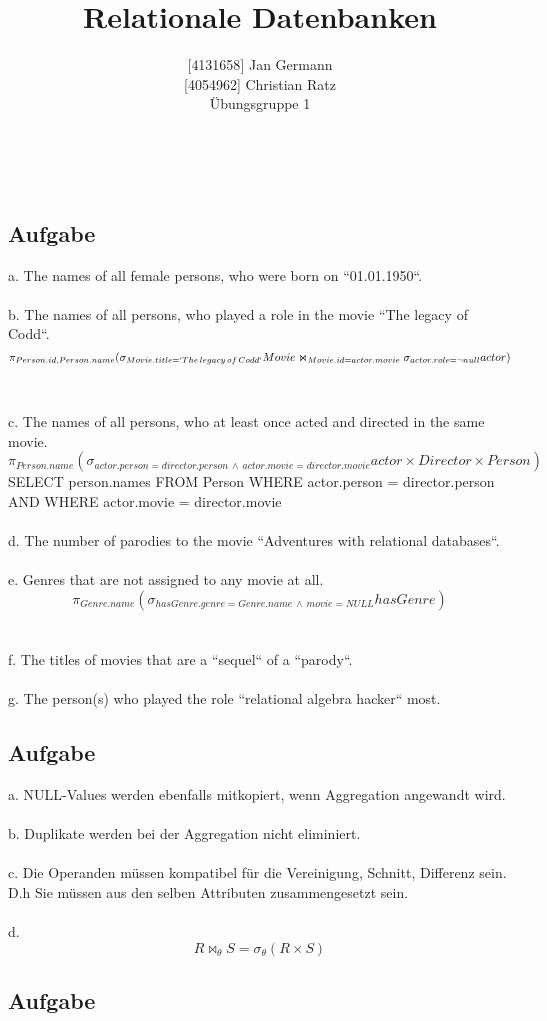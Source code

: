 \documentclass[11pt,a4paper,DIV=9]{scrartcl}
\author{{[}4131658{]} Jan Germann \\{[}4054962{]} Christian Ratz\\Übungsgruppe 1}
\title{Relationale Datenbanken}
\newcounter{temp}
\newcommand{\aufgabe}[1]{
  \setcounter{temp}{\value{subsection}}
  \setcounter{subsection}{#1}
  \addtocounter{subsection}{-1}
  \subsection{Aufgabe}
  \setcounter{subsection}{\value{temp}}
}
\renewcommand{\author}[1]{\renewcommand{\author}{#1}}
\renewcommand{\title}[1]{\renewcommand{\title}{#1}}
\newcommand{\makehomeworktitle}{
  \begin{minipage}[t]{6.5cm}
    \sf{\author}
  \end{minipage}
  \begin{minipage}[t]{6.5cm}
    \begin{flushright}
      \sf{\title\\\today}
    \end{flushright}
  \end{minipage}
  \\[0.2cm]
  \begin{center}
    \sf{
      \color{blue}{
        \LARGE{Aufgabenblatt \blattnr}
      }
    }
  \end{center}
  \vspace{0.1cm}
}
\begin{document}
\makehomeworktitle
\aufgabe{1}
 a. The names of all female persons, who were born on ``01.01.1950``.
 \\\\ b. The names of all persons, who played a role in the movie ``The legacy of Codd``.
 \begin{displaymath} \pi _{Person.id, Person.name} ( \sigma _{Movie.title=`{The\, legacy\, of\, Codd`}} Movie\Join_{Movie.id = actor.movie} \sigma _{actor.role = \neg null} actor)  \end{displaymath}
 \\\\ c. The names of all persons, who at least once acted and directed in the same movie.
 \begin{displaymath} \pi _{Person.name} (\sigma _{actor.person = director.person \,\wedge\, actor.movie = director.movie} actor \times Director \times Person) \end{displaymath}
 SELECT person.names FROM Person WHERE actor.person = director.person AND WHERE actor.movie = director.movie
 \\\\ d. The number of parodies to the movie ``Adventures with relational databases``.
 \\\\ e. Genres that are not assigned to any movie at all.
 \begin{displaymath} \pi _{Genre.name} (\sigma _{hasGenre.genre=Genre.name \,\wedge\, movie = NULL} hasGenre) \end{displaymath}
 \\\\ f. The titles of movies that are a ``sequel`` of a ``parody``.
 \\\\ g. The person(s) who played the role ``relational algebra hacker`` most.
\aufgabe{2}
 a. NULL-Values werden ebenfalls mitkopiert, wenn Aggregation angewandt wird.
 \\\\ b. Duplikate werden bei der Aggregation nicht eliminiert.
 \\\\ c. Die Operanden m\"ussen kompatibel f\"ur die Vereinigung, Schnitt, Differenz sein. D.h Sie m\"ussen aus den selben Attributen zusammengesetzt sein.
\\\\ d. \begin{displaymath} R \Join _{\theta} S =  \sigma _{\theta} (R \times S) \end{displaymath}
\aufgabe{3}
\end{document}
